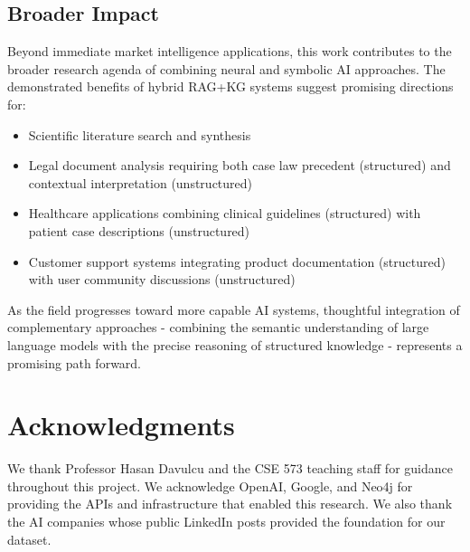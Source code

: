 \documentclass[11pt,twocolumn]{article}
\begin{document}
\subsection{Broader Impact}

Beyond immediate market intelligence applications, this work contributes to the broader research agenda of combining neural and symbolic AI approaches. The demonstrated benefits of hybrid RAG+KG systems suggest promising directions for:

\begin{itemize}
\item Scientific literature search and synthesis
\item Legal document analysis requiring both case law precedent (structured) and contextual interpretation (unstructured)
\item Healthcare applications combining clinical guidelines (structured) with patient case descriptions (unstructured)
\item Customer support systems integrating product documentation (structured) with user community discussions (unstructured)
\end{itemize}

As the field progresses toward more capable AI systems, thoughtful integration of complementary approaches - combining the semantic understanding of large language models with the precise reasoning of structured knowledge - represents a promising path forward.

\section*{Acknowledgments}

We thank Professor Hasan Davulcu and the CSE 573 teaching staff for guidance throughout this project. We acknowledge OpenAI, Google, and Neo4j for providing the APIs and infrastructure that enabled this research. We also thank the AI companies whose public LinkedIn posts provided the foundation for our dataset.
\end{document}
